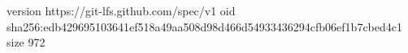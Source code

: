 version https://git-lfs.github.com/spec/v1
oid sha256:edb429695103641ef518a49aa508d98d466d54933436294cfb06ef1b7cbed4c1
size 972
